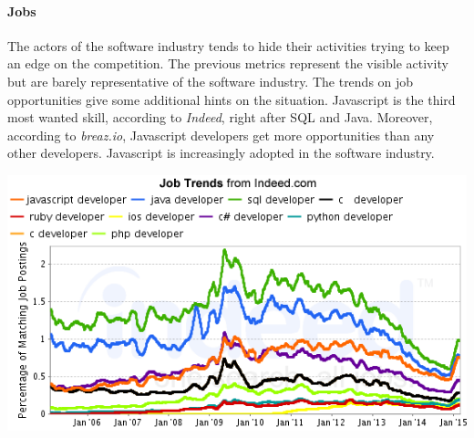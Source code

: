 

\paragraph{Jobs}

The actors of the software industry tends to hide their activities trying to keep an edge on the competition.
The previous metrics represent the visible activity but are barely representative of the software industry.
The trends on job opportunities give some additional hints on the situation.
Javascript is the third most wanted skill, according to \textit{Indeed}, right after SQL and Java.
Moreover, according to \textit{breaz.io}, Javascript developers get more opportunities than any other developers.
Javascript is increasingly adopted in the software industry.

\includegraphics[width=0.9\linewidth]{../../data/js-trends/jobgraph}

